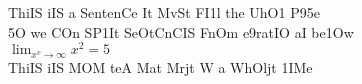 \documentclass{article}%
\begin{document}
%
\normalsize%
ThiIS iIS a SentenCe It MvSt FI1l the UhO1 P95e\\
5O we COn SP1It SeOtCnCIS FnOm e9ratIO aI be1Ow\\
$\lim_{x^{v} \rightarrow \infty} x^{2} = 5$\\
ThiIS iIS MOM teA Mat Mrjt W a WhOljt 1IMe\\%
\end{document}
